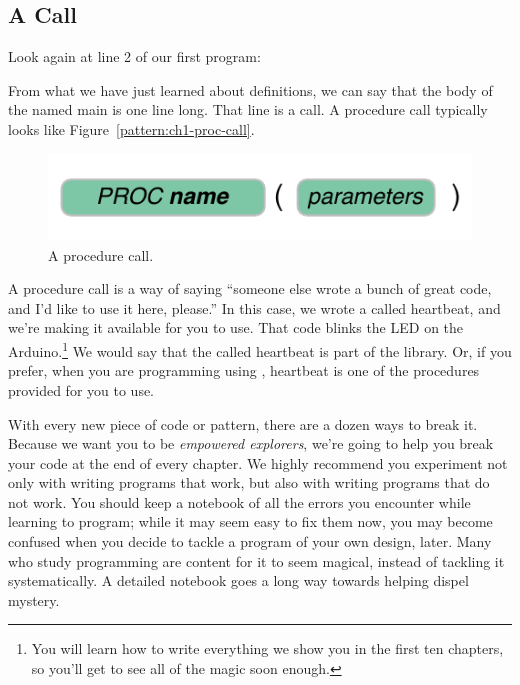 \subsection{A \PROCedure Call}
Look again at line 2 of our first program:



From what we have just learned about \PROC definitions, we can say that the body of the \PROC named {\code main} is one line long. That line is a \PROCedure call. A procedure call typically looks like Figure~\vref{pattern:ch1-proc-call}.

\begin{figure}[h!]
  \begin{center}
    \includegraphics[width=\linewidth]{images/ch1-proc-call-pattern}
    \caption{A procedure call.}
    \label{pattern:ch1-proc-call}
  \end{center}
\end{figure}

A procedure call is a way of saying ``someone else wrote a bunch of great code, and I'd like to use it here, please.'' In this case, we wrote a \PROC called {\code heartbeat}, and we're making it available for you to use. That code blinks the LED on the Arduino.\footnote{You will learn how to write everything we show you in the first ten chapters, so you'll get to see all of the magic soon enough.} We would say that the \PROC called {\code heartbeat} is part of the \plumbing library. Or, if you prefer, when you are programming using \plumbing, {\code heartbeat} is one of the procedures provided for you to use.

\BREAKAGE
With every new piece of code or pattern, there are a dozen ways to break it. Because we want you to be {\em empowered explorers}, we're going to help you break your code at the end of every chapter. We highly recommend you experiment not only with writing programs that work, but also with writing programs that {\strong do not} work. You should keep a notebook of all the errors you encounter while learning to program; while it may seem easy to fix them now, you may become confused when you decide to tackle a program of your own design, later. Many who study programming are content for it to seem magical, instead of tackling it systematically. A detailed notebook goes a long way towards helping dispel mystery.

